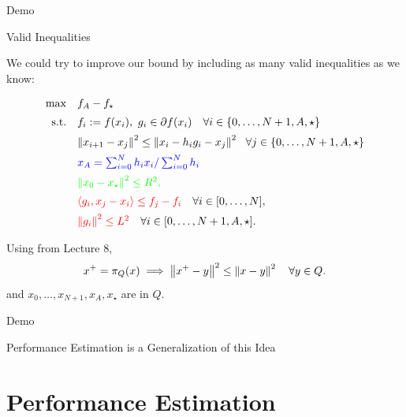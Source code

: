 \documentclass[9pt]{beamer}
\begin{document}
\begin{frame}{Demo}

\end{frame}

\begin{frame}{Valid Inequalities}

  We could try to improve our bound by including as many valid inequalities as we know:
  
  \begin{equation*}
    \begin{array}{rl}
      \max &  f_A-f_\star\\[0.5em]
      \mathrm{s.t.}  & f_i := f(x_i), ~g_i \in \partial f(x_i) \quad \forall i \in \{0, \dots, N+1, A, \star\} \\[0.5em]
           & \left\|x_{i+1}-x_j\right\|^2\leq \left\|x_i-h_i g_i - x_j\right\|^2 ~~\forall j \in \{0, \dots, N+1, A, \star\} \\[0.5em]
           & {\color{blue} x_A= \sum_{i=0}^N h_i x_i/\sum_{i=0}^N h_i}\\[0.5em]
           & \color{green}{\left\|x_0-x_\star\right\|^2\leq R^2},\\[0.5em]
           & {\color{red} \langle  g_i, x_j-x_i\rangle \leq f_j-f_i} \quad \forall i\in [0, \dots, N], \\[0.5em]
           & {\color{red} \left\| g_i\right\|^2\leq L^2} \quad \forall i\in [0, \dots, N+1, A, \star].
    \end{array}
  \end{equation*}

  \vfill

  Using from Lecture 8,
  \[
    x^+ = \pi_Q(x) \implies \left\|x^+-y\right\|^2\leq \left\|x-y\right\|^2 \quad \forall y \in Q.
  \]
  and $x_0, \dots, x_{N+1}, x_A, x_\star$ are in $Q$.

  
\end{frame}

\begin{frame}{Demo}

\end{frame}

\begin{frame}{Performance Estimation is a Generalization of this Idea}

\end{frame}

\section{Performance Estimation}
\end{document}
